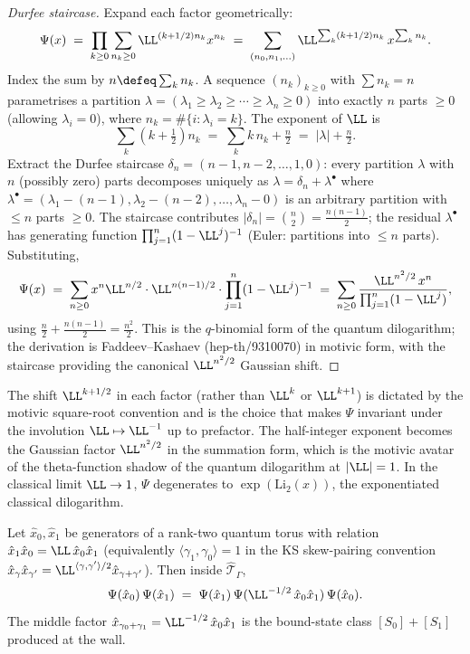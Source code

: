 \begin{proof}[Durfee staircase]
 Expand each factor geometrically:
 \[
 \Psi(x) \;=\; \prod_{k \geq 0} \sum_{n_k \geq 0} \LL^{(k + 1/2) n_k} x^{n_k}
 \;=\; \sum_{(n_0, n_1, \ldots)} \LL^{\sum_k (k + 1/2) n_k}\, x^{\sum_k n_k}.
 \]
 Index the sum by $n \defeq \sum_k n_k$. A sequence $(n_k)_{k \geq 0}$
 with $\sum n_k = n$ parametrises a partition $\lambda = (\lambda_1 \geq
 \lambda_2 \geq \cdots \geq \lambda_n \geq 0)$ into exactly $n$ parts
 $\geq 0$ (allowing $\lambda_i = 0$), where $n_k = \#\{i : \lambda_i =
 k\}$. The exponent of $\LL$ is
 \[
 \sum_k (k + \tfrac{1}{2}) n_k \;=\; \sum_k k\, n_k + \tfrac{n}{2}
 \;=\; |\lambda| + \tfrac{n}{2}.
 \]
 Extract the Durfee staircase $\delta_n = (n-1, n-2, \ldots, 1, 0)$:
 every partition $\lambda$ with $n$ (possibly zero) parts decomposes
 uniquely as $\lambda = \delta_n + \lambda^\bullet$ where $\lambda^\bullet
 = (\lambda_1 - (n-1), \lambda_2 - (n-2), \ldots, \lambda_n - 0)$ is an
 arbitrary partition with $\leq n$ parts $\geq 0$. The staircase
 contributes
 $|\delta_n| = \binom{n}{2} = \frac{n(n-1)}{2}$;
 the residual $\lambda^\bullet$ has generating function
 $\prod_{j=1}^n (1 - \LL^j)^{-1}$ (Euler: partitions into $\leq n$ parts).
 Substituting,
 \[
 \Psi(x)
 \;=\; \sum_{n \geq 0} x^n \LL^{n/2} \cdot \LL^{n(n-1)/2} \cdot
 \prod_{j=1}^n (1 - \LL^j)^{-1}
 \;=\; \sum_{n \geq 0} \frac{\LL^{n^2/2}\, x^n}{\prod_{j=1}^n (1 - \LL^j)},
 \]
 using $\tfrac{n}{2} + \tfrac{n(n-1)}{2} = \tfrac{n^2}{2}$. This is the
 $q$-binomial form of the quantum dilogarithm; the derivation is
 Faddeev--Kashaev (hep-th/9310070) in motivic form, with the staircase
 providing the canonical $\LL^{n^2/2}$ Gaussian shift.
\end{proof}

\begin{remark}
 The shift $\LL^{k + 1/2}$ in each factor (rather than $\LL^k$ or
 $\LL^{k+1}$) is dictated by the motivic square-root convention and is
 the choice that makes $\Psi$ invariant under the involution
 $\LL \mapsto \LL^{-1}$ up to prefactor. The half-integer exponent
 becomes the Gaussian factor $\LL^{n^2/2}$ in the summation form, which
 is the motivic avatar of the theta-function shadow of the quantum
 dilogarithm at $|\LL| = 1$. In the classical limit $\LL \to 1$,
 $\Psi$ degenerates to $\exp(\mathrm{Li}_2(x))$, the exponentiated
 classical dilogarithm.
\end{remark}

\begin{theorem}
 \label{thm:psi-pentagon}
 Let $\hat x_0, \hat x_1$ be generators of a rank-two quantum torus with
 relation $\hat x_1 \hat x_0 = \LL\, \hat x_0 \hat x_1$ (equivalently
 $\langle \gamma_1, \gamma_0 \rangle = 1$ in the KS skew-pairing
 convention $\hat x_\gamma \hat x_{\gamma'} = \LL^{\langle \gamma, \gamma'
 \rangle/2} \hat x_{\gamma + \gamma'}$). Then inside $\hat{\mathcal{T}}_\Gamma$,
 \[
 \Psi(\hat x_0)\, \Psi(\hat x_1)
 \;=\; \Psi(\hat x_1)\, \Psi(\LL^{-1/2}\, \hat x_0 \hat x_1)\, \Psi(\hat x_0).
 \]
 The middle factor $\hat x_{\gamma_0 + \gamma_1} = \LL^{-1/2}\, \hat x_0
 \hat x_1$ is the bound-state class $[S_0] + [S_1]$ produced at the wall.
\end{theorem}

